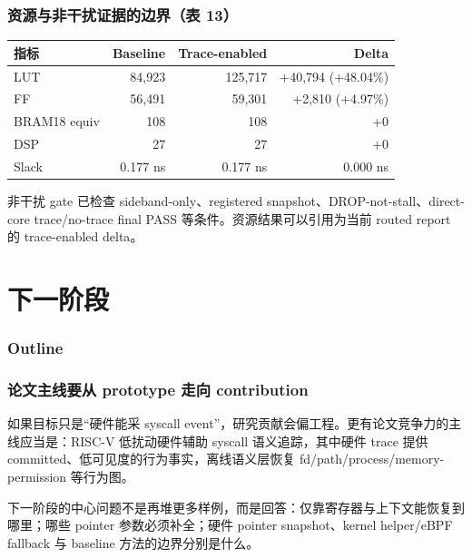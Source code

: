 \documentclass[aspectratio=169,10pt]{beamer}
\begin{document}
\begin{frame}
  \frametitle{资源与非干扰证据的边界（表 13）}
  \vskip0.1cm
  \begin{center}\scriptsize
  \renewcommand{\arraystretch}{1.16}
  \begin{tabular}{@{}lrrr@{}}
    \toprule
    \textbf{指标} & \textbf{Baseline} & \textbf{Trace-enabled} & \textbf{Delta} \\
    \midrule
    LUT & 84,923 & 125,717 & +40,794 (+48.04\%) \\
    \rowcolor{black!4}
    FF & 56,491 & 59,301 & +2,810 (+4.97\%) \\
    BRAM18 equiv & 108 & 108 & +0 \\
    \rowcolor{black!4}
    DSP & 27 & 27 & +0 \\
    Slack & 0.177 ns & 0.177 ns & 0.000 ns \\
    \bottomrule
  \end{tabular}
  \end{center}

  \vskip0.18cm
  \small
  非干扰 gate 已检查 sideband-only、registered snapshot、DROP-not-stall、direct-core trace/no-trace final PASS 等条件。资源结果可以引用为\alert{当前 routed report 的 trace-enabled delta}。

  \vskip0.18cm
\end{frame}

\section{下一阶段}

\begin{frame}
  \frametitle{Outline}
  \vskip0.4cm
  \tableofcontents[currentsection]
\end{frame}

\begin{frame}
  \frametitle{论文主线要从 prototype 走向 contribution}
  \vskip0.1cm

  如果目标只是“硬件能采 syscall event”，研究贡献会偏工程。更有论文竞争力的主线应当是：\alert{RISC-V 低扰动硬件辅助 syscall 语义追踪}，其中硬件 trace 提供 committed、低可见度的行为事实，离线语义层恢复 fd/path/process/memory-permission 等行为图。

  \vskip0.2cm

  下一阶段的中心问题不是再堆更多样例，而是回答：仅靠寄存器与上下文能恢复到哪里；哪些 pointer 参数必须补全；硬件 pointer snapshot、kernel helper/eBPF fallback 与 baseline 方法的边界分别是什么。

  \vskip0.2cm
\end{frame}
\end{document}
